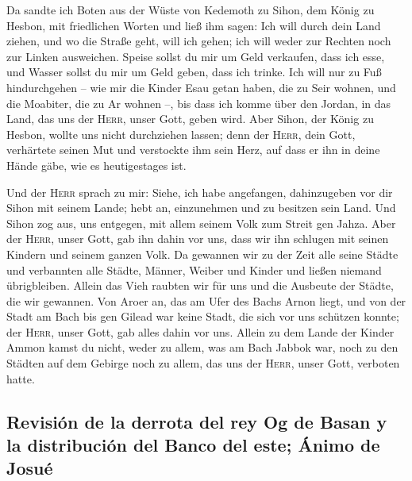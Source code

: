 Da sandte ich Boten aus der Wüste von Kedemoth zu Sihon,
dem König zu Hesbon, mit friedlichen Worten und ließ ihm sagen:
 Ich will durch dein Land ziehen, und wo die Straße geht,
will ich gehen; ich will weder zur Rechten noch zur Linken ausweichen.
 Speise sollst du mir um Geld verkaufen, dass ich esse,
und Wasser sollst du mir um Geld geben, dass ich trinke. Ich will nur zu
Fuß hindurchgehen --  wie mir die Kinder Esau getan
haben, die zu Seir wohnen, und die Moabiter, die zu Ar wohnen --, bis
dass ich komme über den Jordan, in das Land, das uns der \textsc{Herr},
unser Gott, geben wird.  Aber Sihon, der König zu Hesbon,
wollte uns nicht durchziehen lassen; denn der \textsc{Herr}, dein Gott,
verhärtete seinen Mut und verstockte ihm sein Herz, auf dass er ihn in
deine Hände gäbe, wie es heutigestages ist.

 Und der \textsc{Herr} sprach zu mir: Siehe, ich habe
angefangen, dahinzugeben vor dir Sihon mit seinem Lande; hebt an,
einzunehmen und zu besitzen sein Land.  Und Sihon zog
aus, uns entgegen, mit allem seinem Volk zum Streit gen Jahza.
 Aber der \textsc{Herr}, unser Gott, gab ihn dahin vor
uns, dass wir ihn schlugen mit seinen Kindern und seinem ganzen Volk.
 Da gewannen wir zu der Zeit alle seine Städte und
verbannten alle Städte, Männer, Weiber und Kinder und ließen niemand
übrigbleiben.  Allein das Vieh raubten wir für uns und
die Ausbeute der Städte, die wir gewannen.  Von Aroer an,
das am Ufer des Bachs Arnon liegt, und von der Stadt am Bach bis gen
Gilead war keine Stadt, die sich vor uns schützen konnte; der
\textsc{Herr}, unser Gott, gab alles dahin vor uns. 
Allein zu dem Lande der Kinder Ammon kamst du nicht, weder zu allem, was
am Bach Jabbok war, noch zu den Städten auf dem Gebirge noch zu allem,
das uns der \textsc{Herr}, unser Gott, verboten hatte.

\hypertarget{revisiuxf3n-de-la-derrota-del-rey-og-de-basan-y-la-distribuciuxf3n-del-banco-del-este-uxe1nimo-de-josuuxe9}{%
\subsection{Revisión de la derrota del rey Og de Basan y la distribución
del Banco del este; Ánimo de
Josué}\label{revisiuxf3n-de-la-derrota-del-rey-og-de-basan-y-la-distribuciuxf3n-del-banco-del-este-uxe1nimo-de-josuuxe9}}


